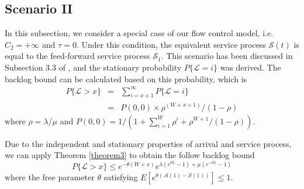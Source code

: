 \documentclass[paper]{ieice}
\begin{document}
\subsection{Scenario II}\label{scenario2}
In this subsection, we consider a special case of our flow control model, i.e. $C_2=+\infty$ and $\tau=0$. Under this condition, the equivalent service process $\mathcal{S}(t)$ is equal to the feed-forward service process $\mathcal{S}_1$. This scenario has been discussed in Subsection 3.3 of \cite{jung1996analysis}, and the stationary probability $P\{\mathcal{L}=i\}$ was derived. The backlog bound can be calculated based on this probability, which is
\begin{eqnarray}\label{oldresult}
P\{\mathcal{L}>x\}&=&\sum_{i=x+1}^\infty P\{\mathcal{L}=i\}\nonumber\\
&=& P(0,0)\times\rho^{(W+x+1)}/(1-\rho)
\end{eqnarray}
where $\rho=\lambda/\mu$ and $P(0,0)=1/(1+\sum_{i=1}^W\rho^i+\rho^{W+1}/(1-\rho))$.

Due to the independent and stationary properties of arrival and service process, we can apply Theorem \ref{theorem3} to obtain the follow backlog bound
\begin{equation}\label{newresult}
P\{\mathcal{L}>x\}\leq e^{-\theta(W+x)}e^{\lambda(e^{\theta L}-1)+\mu(e^{-\theta L}-1)}
\end{equation}
where the free parameter $\theta$ satisfying $E[e^{\theta(\mathcal{A}(1)-\mathcal{S}(1))}]\leq 1$.
\end{document}
